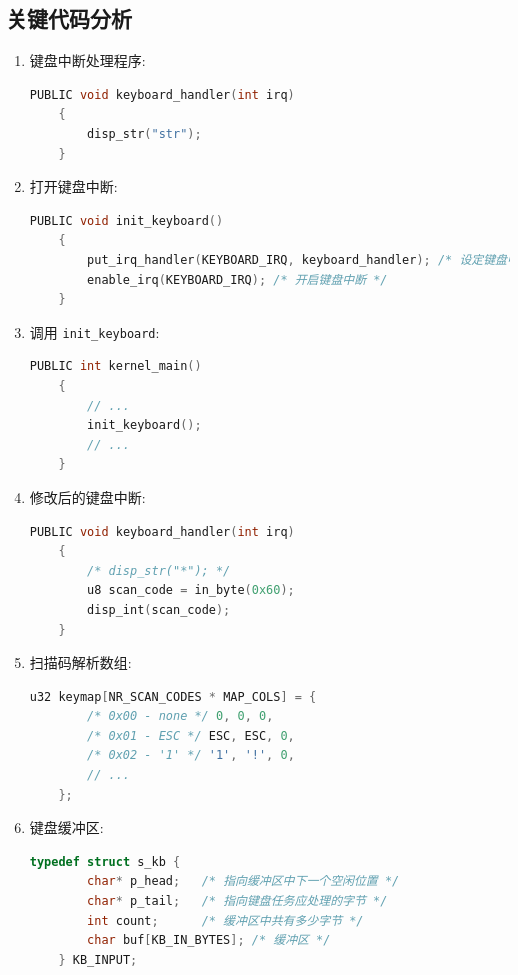 \subsection{关键代码分析}
\begin{enumerate}

    \item 键盘中断处理程序:
    \begin{lstlisting}[language=C]
    PUBLIC void keyboard_handler(int irq)
    {
        disp_str("str");
    }
    \end{lstlisting}
    
    \item 打开键盘中断:
    \begin{lstlisting}[language=C]
    PUBLIC void init_keyboard()
    {
        put_irq_handler(KEYBOARD_IRQ, keyboard_handler); /* 设定键盘中断处理程序 */
        enable_irq(KEYBOARD_IRQ); /* 开启键盘中断 */
    }
    \end{lstlisting}
    
    \item 调用 \texttt{init\_keyboard}:
    \begin{lstlisting}[language=C]
    PUBLIC int kernel_main()
    {
        // ...
        init_keyboard();
        // ...
    }
    \end{lstlisting}
    
    \item 修改后的键盘中断:
    \begin{lstlisting}[language=C]
    PUBLIC void keyboard_handler(int irq)
    {
        /* disp_str("*"); */
        u8 scan_code = in_byte(0x60);
        disp_int(scan_code);
    }
    \end{lstlisting}
    
    \item 扫描码解析数组:
    \begin{lstlisting}[language=C]
    u32 keymap[NR_SCAN_CODES * MAP_COLS] = {
        /* 0x00 - none */ 0, 0, 0,
        /* 0x01 - ESC */ ESC, ESC, 0,
        /* 0x02 - '1' */ '1', '!', 0,
        // ...
    };
    \end{lstlisting}
    
    \item 键盘缓冲区:
    \begin{lstlisting}[language=C]
    typedef struct s_kb {
        char* p_head;   /* 指向缓冲区中下一个空闲位置 */
        char* p_tail;   /* 指向键盘任务应处理的字节 */
        int count;      /* 缓冲区中共有多少字节 */
        char buf[KB_IN_BYTES]; /* 缓冲区 */
    } KB_INPUT;
    \end{lstlisting}
    

\end{enumerate}

